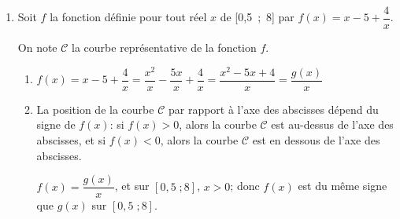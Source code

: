 \begin{enumerate}
\begin{enumerate}
Donc:  $y_{\text{A}_{n+1}} - y_{\text{A}_{n}} = \left (n^2-3n\right ) - \left (n^2-5n+4\right ) = n^2 -3n -n^2 +5n -4=2n-4$.

Or $x_{\text{A}_{n+1}} - x_{\text{A}_{n}} = n+1-n=1$;
donc $a_n=\dfrac{y_{\text{A}_{n+1}} - y_{\text{A}_n}}{x_{\text{A}_{n+1}} - x_{\text{A}_n}} = \dfrac{2n-4}{1}=2n-4$.


		\item %
$a_{n+1}-a_n= \left (2(n+1)-4\right ) - \left (2n-4\right ) = 2n+2-4-2n+4=2$

Donc la suite $(a_n)$ est arithmétique de raison 2.
	\end{enumerate}
	
\item Soit $f$ la fonction définie pour tout réel $x$ de [0,5~;~8] par
$f(x) = x - 5 + \dfrac 4 x.$

On note $\mathcal{C}$ la courbe représentative de la fonction $f$.
	\begin{enumerate}
		\item %
$f(x) = x - 5 + \dfrac 4 x = \dfrac{x^2}{x} - \dfrac{5x}{x} + \dfrac{4}{x}= \dfrac{x^2-5x+4}{x}=\dfrac{g(x)}{x}$		

		\item %
La position de la courbe $\mathcal{C}$ par rapport à l'axe des abscisses dépend du signe de $f(x)$: si $f(x)>0$, alors la courbe $\mathcal{C}$ est au-dessus de l'axe des abscisses, et  si $f(x) < 0$, alors la courbe $\mathcal{C}$ est en dessous de l'axe des abscisses.

$f(x)=\dfrac{g(x)}{x}$, et sur $[0,5\;; 8]$, $x>0$; donc $f(x)$ est du même signe que $g(x)$ sur  $[0,5\;; 8]$.

\medskip



\end{enumerate}
\end{enumerate}
